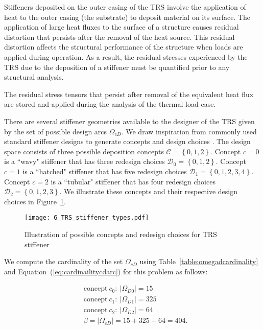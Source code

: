 Stiffeners deposited on the outer casing of the \ac{TRS} involve the application of heat to the outer casing (the substrate) to deposit material on its surface. The application of large heat fluxes to the surface of a structure causes residual distortion that persists after the removal of the heat source. This residual distortion affects the structural performance of the structure when loads are applied during operation. As a result, the residual stresses experienced by the \ac{TRS} due to the deposition of a stiffener must be quantified prior to any structural analysis.

The residual stress tensors that persist after removal of the equivalent heat flux are stored and applied during the analysis of the thermal load case.

There are several stiffener geometries available to the designer of the \ac{TRS} given by the set of possible design arcs $\Omega_{cD}$. We draw inspiration from commonly used standard stiffener designs to generate concepts and design choices \cite{USArmyMaterielCommand1970}. The design space consists of three possible deposition concepts $\mathcal{C} = \left\{0,1,2\right\}$. Concept $c=0$ is a ``wavy" stiffener that has three redesign choices $\mathcal{D}_0 = \left\{0,1,2\right\}$. Concept $c=1$ is a ``hatched" stiffener that has five redesign choices $\mathcal{D}_1 = \left\{0,1,2,3,4\right\}$. Concept $c=2$ is a ``tubular" stiffener that has four redesign choices $\mathcal{D}_2 = \left\{0,1,2,3\right\}$. We illustrate these concepts and their respective design choices in Figure~\ref{fig:designspacestiff}.
%
\begin{figure}[h]
	\centering
	\texttt{[image: 6\_TRS\_stiffener\_types.pdf]}
	\caption{Illustration of possible concepts and redesign choices for \ac{TRS} stiffener}
	\label{fig:designspacestiff}
\end{figure}

We compute the cardinality of the set $\Omega_{cD}$ using Table~\ref{table:omegadcardinality} and Equation~(\ref{eq:cardinailitycdarc}) for this problem as follows:

\begin{equation*}
	\begin{aligned}
		& \mathrm{concept~}c_0:~|\Omega_{D0}| = 15\\
		& \mathrm{concept~}c_1:~|\Omega_{D1}| = 325\\
		& \mathrm{concept~}c_2:~|\Omega_{D2}| = 64\\
		& \beta = |\Omega_{cD}| = 15 + 325 + 64 = 404.\\
	\end{aligned}
\end{equation*}

